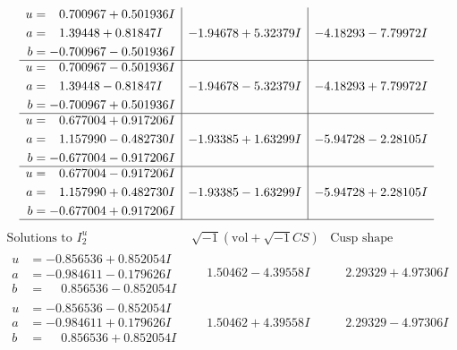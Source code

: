 \documentclass[1p]{elsarticle_modified}
\theoremstyle{definition}
\newcommand{\I}{\sqrt{-1}}
\begin{document}
$$\begin{array}{c|c|c}
\begin{aligned}
u &= \phantom{-}0.700967 + 0.501936 I \\
a &= \phantom{-}1.39448 + 0.81847 I \\
b &= -0.700967 - 0.501936 I\end{aligned}
 & -1.94678 + 5.32379 I & -4.18293 - 7.79972 I \\ \hline\begin{aligned}
u &= \phantom{-}0.700967 - 0.501936 I \\
a &= \phantom{-}1.39448 - 0.81847 I \\
b &= -0.700967 + 0.501936 I\end{aligned}
 & -1.94678 - 5.32379 I & -4.18293 + 7.79972 I \\ \hline\begin{aligned}
u &= \phantom{-}0.677004 + 0.917206 I \\
a &= \phantom{-}1.157990 - 0.482730 I \\
b &= -0.677004 - 0.917206 I\end{aligned}
 & -1.93385 + 1.63299 I & -5.94728 - 2.28105 I \\ \hline\begin{aligned}
u &= \phantom{-}0.677004 - 0.917206 I \\
a &= \phantom{-}1.157990 + 0.482730 I \\
b &= -0.677004 + 0.917206 I\end{aligned}
 & -1.93385 - 1.63299 I & -5.94728 + 2.28105 I\\
 \hline 
 \end{array}$$\newpage$$\begin{array}{c|c|c}  
\text{Solutions to }I^u_{2}& \I (\text{vol} + \sqrt{-1}CS) & \text{Cusp shape}\\
 \hline 
\begin{aligned}
u &= -0.856536 + 0.852054 I \\
a &= -0.984611 - 0.179626 I \\
b &= \phantom{-}0.856536 - 0.852054 I\end{aligned}
 & \phantom{-}1.50462 - 4.39558 I & \phantom{-}2.29329 + 4.97306 I \\ \hline\begin{aligned}
u &= -0.856536 - 0.852054 I \\
a &= -0.984611 + 0.179626 I \\
b &= \phantom{-}0.856536 + 0.852054 I\end{aligned}
 & \phantom{-}1.50462 + 4.39558 I & \phantom{-}2.29329 - 4.97306 I \\ \hline\begin{aligned}

\end{aligned}
\end{array}$$
\end{document}
